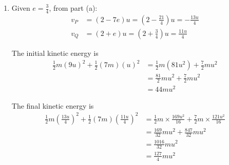 \documentclass[leqno]{article}
\begin{document}
\begin{enumerate}[
  label=\textbf{\arabic*.},
  leftmargin=*,
  topsep=0pt,
  partopsep=0pt,
  parsep=0pt
]
\begin{djsSolution}
\begin{enumerate}[label=\textbf{(\alph*)}]
  From the second equation:
  \[
  v_Q=v_P+8eu
  \]

  Substitute into the first equation:
  \begin{align*}
  v_P+7(v_P+8eu)&=16u \\
  8v_P+56eu&=16u \\
  8v_P&=16u-56eu \\
  v_P&=(2-7e)u
  \end{align*}

  Then
  \begin{align*}
  v_Q&=v_P+8eu \\
  &=(2-7e)u+8eu \\
  &=(2+e)u
  \end{align*}

  We are told that after the collision the direction of motion of $P$ is reversed, so $v_P<0$.
  Therefore
  \begin{align*}
  (2-7e)u&<0
  \end{align*}

  and since $u>0$:
  \begin{align*}
  2-7e&<0 \\
  e&>\frac{2}{7}
  \end{align*}

  Also, for a coefficient of restitution:
  \[
  0\leq e\leq 1
  \]

  Combining these gives
  \[
  \frac{2}{7}<e\leq 1
  \]


  \item Given $e=\frac34$, from part (a):
  \begin{align*}
  v_P&=(2-7e)u=\left(2-\frac{21}{4}\right)u=-\frac{13u}{4} \\
  v_Q&=(2+e)u=\left(2+\frac34\right)u=\frac{11u}{4}
  \end{align*}

  The initial kinetic energy is
  \begin{align*}
  \frac12 m(9u)^2+\frac12(7m)(u)^2
  &=\frac12 m(81u^2)+\frac72 mu^2 \\
  &=\frac{81}{2}mu^2+\frac{7}{2}mu^2 \\
  &=44mu^2
  \end{align*}

  The final kinetic energy is
  \begin{align*}
  \frac12 m\left(\frac{13u}{4}\right)^2+\frac12(7m)\left(\frac{11u}{4}\right)^2
  &=\frac12 m\times \frac{169u^2}{16}+\frac{7}{2}m\times \frac{121u^2}{16} \\
  &=\frac{169}{32}mu^2+\frac{847}{32}mu^2 \\
  &=\frac{1016}{32}mu^2 \\
  &=\frac{127}{4}mu^2
  \end{align*}


\end{enumerate}
\end{djsSolution}
\end{enumerate}
\end{document}
